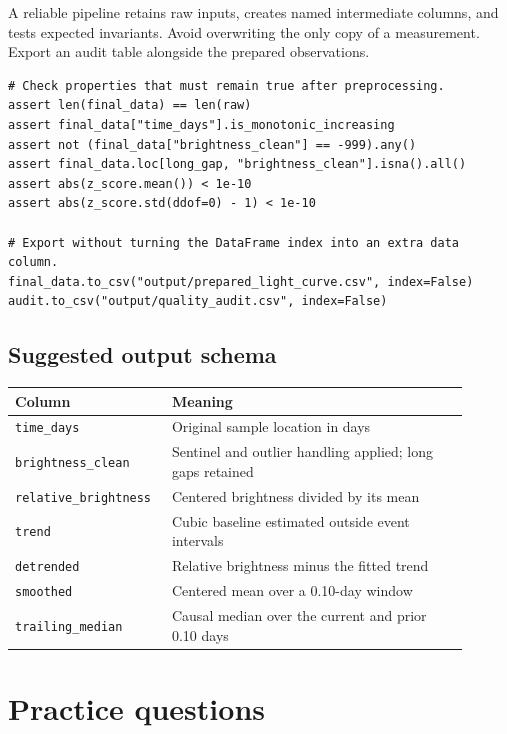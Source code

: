 \documentclass[11pt,letterpaper]{article}
\begin{document}
A reliable pipeline retains raw inputs, creates named intermediate columns, and
tests expected invariants. Avoid overwriting the only copy of a measurement.
Export an audit table alongside the prepared observations.

\begin{lstlisting}
# Check properties that must remain true after preprocessing.
assert len(final_data) == len(raw)
assert final_data["time_days"].is_monotonic_increasing
assert not (final_data["brightness_clean"] == -999).any()
assert final_data.loc[long_gap, "brightness_clean"].isna().all()
assert abs(z_score.mean()) < 1e-10
assert abs(z_score.std(ddof=0) - 1) < 1e-10

# Export without turning the DataFrame index into an extra data column.
final_data.to_csv("output/prepared_light_curve.csv", index=False)
audit.to_csv("output/quality_audit.csv", index=False)
\end{lstlisting}

\subsection{Suggested output schema}

\begin{center}
\begin{tabular}{@{}p{0.28\linewidth}p{0.62\linewidth}@{}}
\toprule
Column & Meaning \\
\midrule
\texttt{time\_days} & Original sample location in days \\
\texttt{brightness\_clean} & Sentinel and outlier handling applied; long gaps retained \\
\texttt{relative\_brightness} & Centered brightness divided by its mean \\
\texttt{trend} & Cubic baseline estimated outside event intervals \\
\texttt{detrended} & Relative brightness minus the fitted trend \\
\texttt{smoothed} & Centered mean over a 0.10-day window \\
\texttt{trailing\_median} & Causal median over the current and prior 0.10 days \\
\bottomrule
\end{tabular}
\end{center}

\section{Practice questions}
\end{document}
